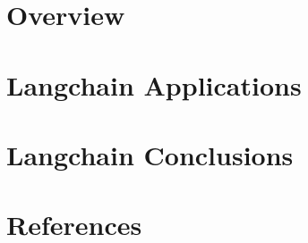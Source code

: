 \section[Overview]{Overview}


% 

\section[Apps]{Langchain Applications}


\section[Concl]{Langchain Conclusions}


\section[Refs]{References}
